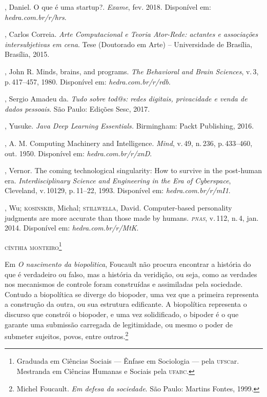 \begin{bibliohedra}
, Daniel. O que é uma startup?. \textit{Exame}, fev. 2018. Disponível em: \textit{hedra.com.br/r/hrs}.

, Carlos Correia. \textit{Arte Computacional e Teoria Ator-Rede:
actantes e associações intersubjetivas em cena}. Tese (Doutorado em Arte) --
Universidade de Brasília, Brasília, 2015.

, John R. Minds, brains, and programs. \textit{The Behavioral and
Brain Sciences}, v.\,3, p.\,417--457, 1980.
Disponível em: \textit{hedra.com.br/r/rdb}.

, Sergio Amadeu da. \textit{Tudo sobre tod@s: redes digitais,
privacidade e venda de dados pessoais}. São Paulo: Edições Sesc, 2017.

, Yusuke. \textit{Java Deep Learning Essentials.} Birmingham: Packt
Publishing, 2016.

, A. M. Computing Machinery and Intelligence. \textit{Mind}, v.\,49, n.\,236, p.\,433--460, out. 1950. Disponível em: \textit{hedra.com.br/r/xnD}.

, Vernor. The coming technological singularity: How to
survive in the post-human era. \textit{Interdisciplinary Science and
Engineering in the Era of Cyberspace}, Cleveland, v.\,10129, p.\,11--22,
1993. Disponível em: \textit{hedra.com.br/r/mI1}.

, Wu; \textsc{kosinskib}, Michal; \textsc{stillwella}, David.
Computer-based personality judgments are more accurate than
those made by humans. \textit{\textsc{pnas}}, v.\,112, n.\,4, jan. 2014. Disponível em: \textit{hedra.com.br/r/MtK}.
\end{bibliohedra}




\begin{flushright}
\textsc{cínthia monteiro\footnote{Graduada em Ciências Sociais --- Ênfase em Sociologia --- pela \textsc{ufsc}ar. Mestranda em Ciências Humanas e Sociais pela \textsc{ufabc}.}}
\end{flushright}

\noindent{}Em \textit{O nascimento da biopolitica}, Foucault não procura
encontrar a história do que é verdadeiro ou falso, mas a história da
veridição, ou seja, como as verdades nos mecanismos de controle foram
construídas e assimiladas pela sociedade. Contudo a biopolítica se
diverge do biopoder, uma vez que a primeira representa a construção da
outra, ou sua estrutura edificante. A biopolítica representa o discurso
que constrói o biopoder, e uma vez solidificado, o bipoder é o que
garante uma submissão carregada de legitimidade, ou mesmo o poder de
submeter sujeitos, povos, entre outros.\footnote{Michel Foucault. \textit{Em defesa da sociedade}. São Paulo: Martins Fontes, 1999.}

